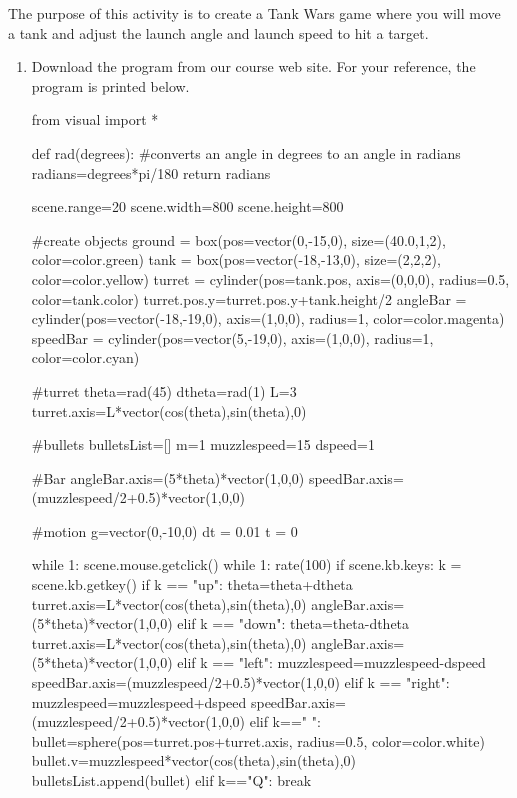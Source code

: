 
\apparatus
{}

\longgoal

The purpose of this activity is to create a Tank Wars game where you will move a tank and adjust the launch angle and launch speed to hit a target.

\procedure

\begin{enumerate}
        
\item Download the program  from our course web site. For your reference, the program is printed below.

\begin{vpythonblock}
from visual import *

def rad(degrees): #converts an angle in degrees to an angle in radians
    radians=degrees*pi/180
    return radians

scene.range=20
scene.width=800
scene.height=800

#create objects
ground = box(pos=vector(0,-15,0), size=(40.0,1,2), color=color.green)
tank = box(pos=vector(-18,-13,0), size=(2,2,2), color=color.yellow)
turret = cylinder(pos=tank.pos, axis=(0,0,0), radius=0.5, color=tank.color)
turret.pos.y=turret.pos.y+tank.height/2
angleBar = cylinder(pos=vector(-18,-19,0), axis=(1,0,0), radius=1, color=color.magenta)
speedBar = cylinder(pos=vector(5,-19,0), axis=(1,0,0), radius=1, color=color.cyan)

#turret
theta=rad(45)
dtheta=rad(1)
L=3
turret.axis=L*vector(cos(theta),sin(theta),0)

#bullets
bulletsList=[]
m=1
muzzlespeed=15
dspeed=1

#Bar
angleBar.axis=(5*theta)*vector(1,0,0)
speedBar.axis=(muzzlespeed/2+0.5)*vector(1,0,0)

#motion
g=vector(0,-10,0)
dt = 0.01
t = 0

while 1:
    scene.mouse.getclick()
    while 1:
        rate(100)
        if scene.kb.keys:
            k = scene.kb.getkey()
            if k == "up":
                theta=theta+dtheta
                turret.axis=L*vector(cos(theta),sin(theta),0)
                angleBar.axis=(5*theta)*vector(1,0,0)
            elif k == "down":
                theta=theta-dtheta
                turret.axis=L*vector(cos(theta),sin(theta),0)
                angleBar.axis=(5*theta)*vector(1,0,0)
            elif k == "left":
                muzzlespeed=muzzlespeed-dspeed
                speedBar.axis=(muzzlespeed/2+0.5)*vector(1,0,0)
            elif k == "right":
                muzzlespeed=muzzlespeed+dspeed
                speedBar.axis=(muzzlespeed/2+0.5)*vector(1,0,0)
            elif k==" ":
                bullet=sphere(pos=turret.pos+turret.axis, radius=0.5, color=color.white)
                bullet.v=muzzlespeed*vector(cos(theta),sin(theta),0)
                bulletsList.append(bullet)
            elif k=="Q":
                break


\end{vpythonblock}
\end{enumerate}

